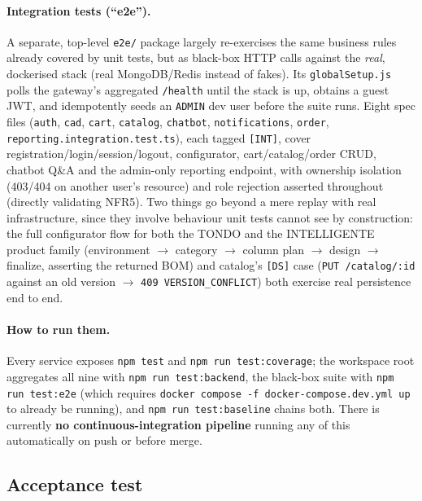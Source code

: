 \begin{sloppypar}
\paragraph{Integration tests (``e2e'').} A separate, top-level \texttt{e2e/}
package largely re-exercises the same business rules already covered by unit
tests, but as black-box HTTP calls against the \emph{real}, dockerised stack
(real MongoDB/Redis instead of fakes).
Its \texttt{globalSetup.js} polls the gateway's aggregated
\texttt{/health} until the stack is up, obtains a
guest JWT, and idempotently seeds an \texttt{ADMIN} dev user before the suite
runs. Eight spec files (\texttt{auth}, \texttt{cad}, \texttt{cart},
\texttt{catalog}, \texttt{chatbot}, \texttt{notifications}, \texttt{order},
\texttt{reporting.integration.test.ts}), each tagged \texttt{[INT]}, cover
registration/login/session/logout, configurator, cart/catalog/order CRUD,
chatbot Q\&A and the admin-only reporting endpoint, with ownership isolation
(403/404 on another user's resource) and role rejection asserted throughout
(directly validating NFR5). Two things go beyond a mere replay with real
infrastructure, since they involve behaviour unit tests cannot see by
construction: the full configurator flow for both the TONDO and the INTELLIGENTE product family 
(environment $\to$ category $\to$ column
plan $\to$ design $\to$ finalize, asserting the returned BOM) and catalog's
\texttt{[DS]} case (\texttt{PUT /catalog/:id} against an old version $\to$
\texttt{409 VERSION\_CONFLICT}) both exercise real persistence end to end.
\end{sloppypar}

\begin{sloppypar}
\paragraph{How to run them.} Every service exposes \texttt{npm test} and \texttt{npm run test:coverage}; 
the workspace
root aggregates all nine with \texttt{npm run test:backend}, the black-box
suite with \texttt{npm run test:e2e} (which requires
\texttt{docker compose -f docker-compose.dev.yml up} to already be running),
and \texttt{npm run test:baseline} chains both. There is currently
\textbf{no continuous-integration pipeline} running any of this
automatically on push or before merge.
\end{sloppypar}

\subsection{Acceptance test}\label{acceptance-test}

